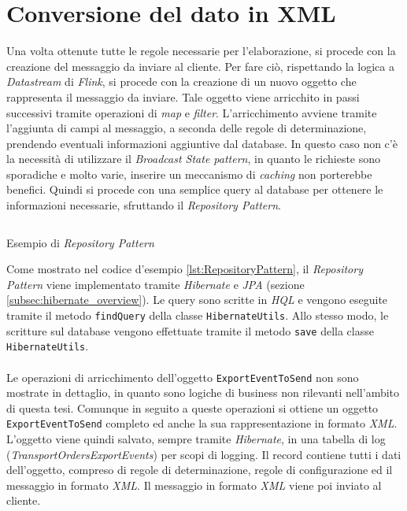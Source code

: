 \section{Conversione del dato in XML}
\label{sec:ConversioneDelDatoInXML}
Una volta ottenute tutte le regole necessarie per l'elaborazione, si procede con la creazione del messaggio da inviare al cliente.
Per fare ciò, rispettando la logica a \textit{Datastream} di \textit{Flink}, si procede con la creazione di un nuovo oggetto che rappresenta il messaggio da inviare.
Tale oggetto viene arricchito in passi successivi tramite operazioni di \textit{map} e \textit{filter}.
L'arricchimento avviene tramite l'aggiunta di campi al messaggio, a seconda delle regole di determinazione, prendendo eventuali informazioni aggiuntive dal database.
In questo caso non c'è la necessità di utilizzare il \textit{Broadcast State pattern}, in quanto le richieste sono sporadiche e molto varie,
inserire un meccanismo di \textit{caching} non porterebbe benefici.
Quindi si procede con una semplice query al database per ottenere le informazioni necessarie, sfruttando il \textit{Repository Pattern}.
\begin{code}
    \inputminted[linenos,fontsize=\footnotesize]{java}{listings/EventsExport/RepositoryPattern.java}
    \caption{Esempio di \textit{Repository Pattern}}
    \label{lst:RepositoryPattern}
\end{code}
Come mostrato nel codice d'esempio \ref{lst:RepositoryPattern}, il \textit{Repository Pattern} viene implementato tramite \textit{Hibernate} e \textit{JPA} (sezione \ref{subsec:hibernate_overview}).
Le query sono scritte in \textit{HQL} e vengono eseguite tramite il metodo \texttt{findQuery} della classe \texttt{HibernateUtils}.
Allo stesso modo, le scritture sul database vengono effettuate tramite il metodo \texttt{save} della classe \texttt{HibernateUtils}.\\\\
Le operazioni di arricchimento dell'oggetto \texttt{ExportEventToSend} non sono mostrate in dettaglio, in quanto sono logiche di business non rilevanti nell'ambito di questa tesi.
Comunque in seguito a queste operazioni si ottiene un oggetto \texttt{ExportEventToSend} completo ed anche la sua rappresentazione in formato \textit{XML}.
L'oggetto viene quindi salvato, sempre tramite \textit{Hibernate}, in una tabella di log (\textit{TransportOrdersExportEvents}) per scopi di logging.
Il record contiene tutti i dati dell'oggetto, compreso di regole di determinazione, regole di configurazione ed il messaggio in formato \textit{XML}.
Il messaggio in formato \textit{XML} viene poi inviato al cliente.

